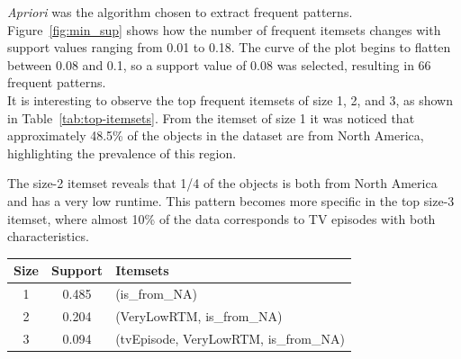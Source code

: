 \textit{Apriori} was the algorithm chosen to extract frequent patterns. 
Figure~\ref{fig:min_sup} shows how the number of frequent itemsets changes with support values ranging from 0.01 to 0.18. 
The curve of the plot begins to flatten between 0.08 and 0.1, so a support value of 0.08 was selected, resulting in 66 frequent patterns.\\
It is interesting to observe the top frequent itemsets of size 1, 2, and 3, as shown in Table~\ref{tab:top-itemsets}. 
From the itemset of size 1 it was noticed that approximately 48.5\% of the objects in the dataset are from North America, highlighting the prevalence of this region.

\begin{minipage}{0.42\textwidth}
The size-2 itemset reveals that 1/4 of the objects is both from North America and has a very low runtime.
This pattern becomes more specific in the top size-3 itemset, where almost 10\% of the data corresponds to TV episodes with both characteristics.
\end{minipage}
\hfill
\begin{minipage}{0.56\textwidth}
\centering
\begin{tabular}{ccl}
\toprule
\textbf{Size} & \textbf{Support} & \textbf{Itemsets} \\
\midrule
1 & 0.485 & (is\_from\_NA) \\
2 & 0.204 & (VeryLowRTM, is\_from\_NA) \\
3 & 0.094 & (tvEpisode, VeryLowRTM, is\_from\_NA) \\
\bottomrule
\end{tabular}
\label{tab:top-itemsets}
\end{minipage}






